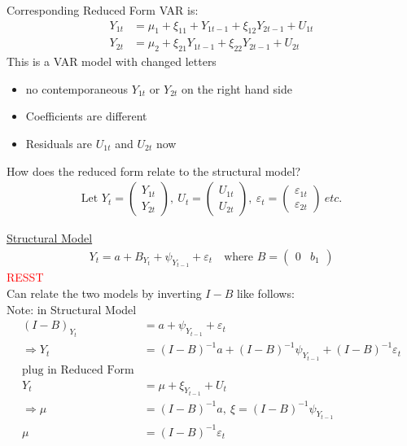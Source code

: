 Corresponding Reduced Form VAR is:
\begin{align*}
    Y_{1t} &= \mu_1 + \xi_{11} + Y_{1t-1} + \xi_{12} Y_{2t-1} + U_{1t}\\
    Y_{2t} &= \mu_2 + \xi_{21} Y_{1t-1} + \xi_{22} Y_{2t-1} + U_{2t}
\end{align*}
This is a VAR model with changed letters 
\begin{itemize}
    \item no contemporaneous $Y_{1t}$ or $Y_{2t}$ on the right hand side
    \item Coefficients are different
    \item Residuals are $U_{1t}$ and $U_{2t}$ now
\end{itemize}
How does the reduced form relate to the structural model? 
\begin{align*}
    \text{Let } Y_t = \begin{pmatrix}
        Y_{1t} \\
        Y_{2t}
    \end{pmatrix},\ U_t = \begin{pmatrix}
        U_{1t} \\
        U_{2t}
    \end{pmatrix},\  \varepsilon_t = \begin{pmatrix}
        \varepsilon_{1t}\\
        \varepsilon_{2t}
    \end{pmatrix} \ etc.
\end{align*}

\underline{Structural Model}
\begin{align*}
    Y_t = a + B_{Y_t} + \psi_{Y_{t-1}} + \varepsilon_t \quad \text{where } B=\begin{pmatrix}
        0 & b_1  
    \end{pmatrix}
\end{align*}
\textcolor{red}{RESST}\\

Can relate the two models by inverting $I-B$ like follows:\\

Note: in Structural Model \begin{align*}
    (I-B)_{Y_t} &= a + \psi_{Y_{t-1}} + \varepsilon_t \\
    \Rightarrow Y_t &= (I-B)^{-1} a + (I-B)^{-1} \psi_{Y_{t-1}}+ (I-B)^{-1}\varepsilon_t \\
    \text{plug in Reduced Form} \\
    Y_t&= \mu+ \xi_{Y_{t-1}}+ U_t \\
    \Rightarrow \mu&= (I-B)^{-1}a,\ \xi= (I-B)^{-1} \psi_{Y_{t-1}} \\
    \mu &= (I-B)^{-1} \varepsilon_t
\end{align*}

